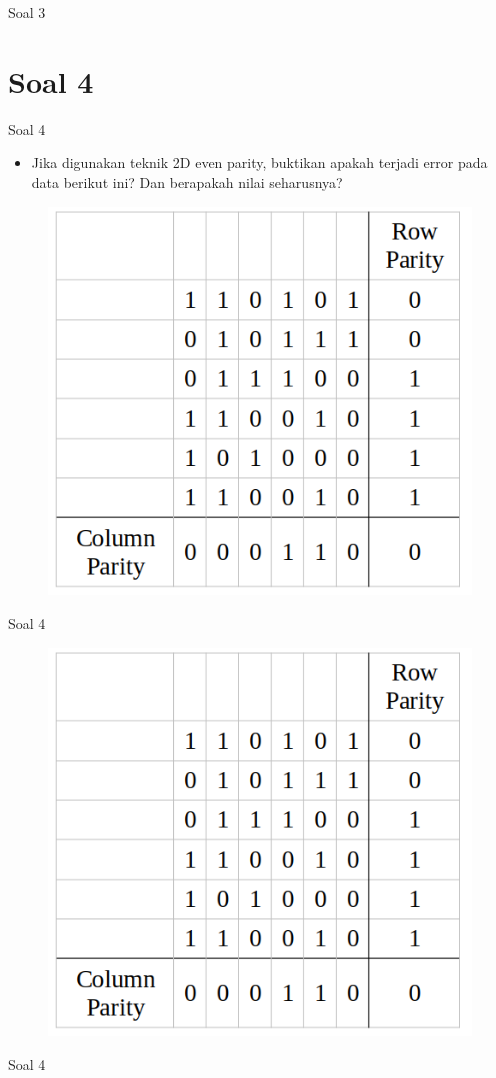 \documentclass[aspectratio=169]{beamer}
\begin{document}
\begin{frame}[t]{Soal 3}
	
\end{frame}

\section{Soal 4}

\begin{frame}[t]{Soal 4}
	\begin{itemize}
		\item Jika digunakan teknik 2D even parity, buktikan apakah terjadi error pada data berikut ini? Dan berapakah nilai seharusnya?
	\end{itemize}

	\begin{figure}
		\centering
		\includegraphics[width=0.4\linewidth]{../../../soal/kuis/soal4_kuis2}
	\end{figure}
\end{frame}

\begin{frame}[t]{Soal 4}
	\begin{figure}
		\centering
		\includegraphics[width=0.5\linewidth]{../../../soal/kuis/soal4_kuis2}
	\end{figure}
\end{frame}

\begin{frame}[t]{Soal 4}
	
\end{frame}
\end{document}
